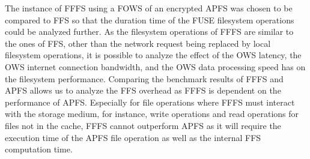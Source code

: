 The instance of \gls{FFFS} using a \gls{FOWS} of an encrypted \gls{APFS} was chosen to be compared to \gls{FFS} so that the duration time of the \gls{FUSE} filesystem operations could be analyzed further. As the filesystem operations of \gls{FFFS} are similar to the ones of \gls{FFS}, other than the network request being replaced by local filesystem operations, it is possible to analyze the effect of the \gls{OWS} latency, the \gls{OWS} internet connection bandwidth, and the \gls{OWS} data processing speed has on the filesystem performance. 
Comparing the benchmark results of \gls{FFFS} and \gls{APFS} allows us to analyze the \gls{FFS} overhead as \gls{FFFS} is dependent on the performance of \gls{APFS}. Especially for file operations where \gls{FFFS} must interact with the storage medium, for instance, write operations and read operations for files not in the cache, \gls{FFFS} cannot outperform \gls{APFS} as it will require the execution time of the \gls{APFS} file operation as well as the internal \gls{FFS} computation time.

